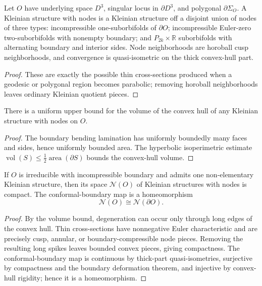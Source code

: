 \begin{definition}
\label{thurston-ch13-kleinian-nodes}

Let $O$ have underlying space $D^3$, singular locus in $\partial D^3$, and
polygonal $\partial\Sigma_O$.  A Kleinian structure with nodes is a Kleinian
structure off a disjoint union of nodes of three types: incompressible
one-suborbifolds of $\partial O$; incompressible Euler-zero two-suborbifolds
with nonempty boundary; and $P_{2k}\times\mathbb R$ suborbifolds with alternating
boundary and interior sides.  Node neighborhoods are horoball cusp
neighborhoods, and convergence is quasi-isometric on the thick convex-hull
part.
\end{definition}
\begin{proof}
\sketch These are exactly the possible thin cross-sections produced when a
geodesic or polygonal region becomes parabolic; removing horoball
neighborhoods leaves ordinary Kleinian quotient pieces.
\end{proof}

\begin{lemma}
\label{thurston-ch13-convex-hull-volume}

There is a uniform upper bound for the volume of the convex hull of any
Kleinian structure with nodes on $O$.
\end{lemma}
\begin{proof}
\sketch The boundary bending lamination has uniformly boundedly many faces and
sides, hence uniformly bounded area.  The hyperbolic isoperimetric estimate
$\operatorname{vol}(S)\leq\tfrac12\operatorname{area}(\partial S)$ bounds the
convex-hull volume.
\end{proof}

\begin{theorem}
\label{thurston-ch13-kleinian-compactification}

If $O$ is irreducible with incompressible boundary and admits one non-elementary
Kleinian structure, then its space $\mathcal N(O)$ of Kleinian structures with
nodes is compact.  The conformal-boundary map is a homeomorphism
\[
\mathcal N(O)\cong\mathcal N(\partial O).
\]
\end{theorem}
\begin{proof}
\sketch By the volume bound, degeneration can occur only through long edges of
the convex hull.  Thin cross-sections have nonnegative Euler characteristic and
are precisely cusp, annular, or boundary-compressible node pieces.  Removing
the resulting long spikes leaves bounded convex pieces, giving compactness.
The conformal-boundary map is continuous by thick-part quasi-isometries,
surjective by compactness and the boundary deformation theorem, and injective
by convex-hull rigidity; hence it is a homeomorphism.
\end{proof}
